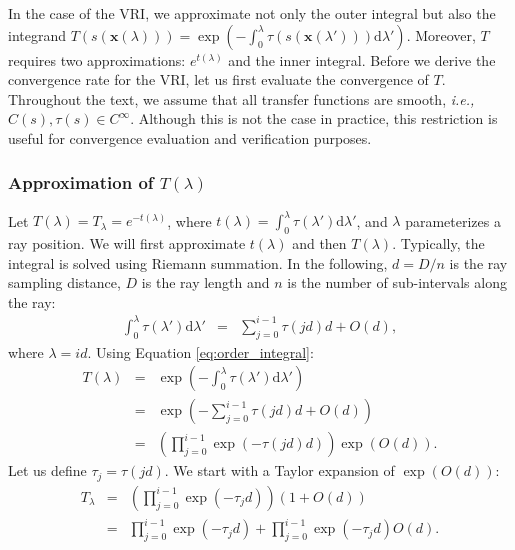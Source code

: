 In the case of the VRI, we approximate not only the outer integral but
also the integrand $T(s(\mathbf{x}(\lambda))) =
\exp\left(-\int_0^{\lambda} \tau(s(\mathbf{x}(\lambda')))
\mathrm{d}\lambda' \right)$. Moreover, $T$ requires two
approximations: $e^{t(\lambda)}$ and the inner integral. Before we derive the
convergence rate for the VRI, let us first evaluate the convergence of
$T$. Throughout the text, we assume that all transfer functions are
smooth, {\em i.e.,} $C(s), \tau(s) \in C^\infty$. Although
this is not the case in practice, this restriction is useful for convergence
evaluation and verification purposes.

\subsubsection{Approximation of $T(\lambda)$}
\label{appx:approximationT}

Let $T(\lambda) = T_\lambda = e^{-t(\lambda)}$, where $t(\lambda) = \int_0^{\lambda} \tau(\lambda')
\mathrm{d}\lambda'$, and $\lambda$ parameterizes a ray position. We
will first approximate $t(\lambda)$ and then $T(\lambda)$. Typically, the
integral is solved using Riemann summation. 
In the following, $d = D / n$ is the ray sampling distance, 
$D$ is the ray length and $n$ is the number of sub-intervals along the ray:
\begin{eqnarray}
\int_0^{\lambda} \tau(\lambda') \mathrm{d}\lambda' & = &
\sum_{j=0}^{i-1}\tau(j d) d + O(d) \label{eq:order_integral},
\end{eqnarray}
%
where $\lambda = i d$. Using Equation \eqref{eq:order_integral}:
\begin{eqnarray}
T(\lambda) &=& \exp\left(-\int_0^{\lambda} \tau(\lambda')
\mathrm{d}\lambda'\right)\\ 
 & = & \exp\left(-\sum_{j=0}^{i-1}\tau(j d) d + O(d)\right)\\ 
& = & \left(\prod_{j=0}^{i-1}\exp\left(-\tau(j d) d\right)\right)
\exp\left(O(d)\right). 
\end{eqnarray}
%
Let us define $\tau_j = \tau(j d)$. We start with a Taylor expansion
of $\exp\left(O(d)\right)$:
%
\begin{eqnarray}
T_\lambda 
&=& \left(\prod_{j=0}^{i-1}\exp\left(-\tau_j d\right)\right) \left(1 + O(d) \right)\\
& = & \prod_{j=0}^{i-1}\exp\left(-\tau_j d\right) + \prod_{j=0}^{i-1}\exp\left(-\tau_j d\right)O(d).  \label{eq:m}
\end{eqnarray}

